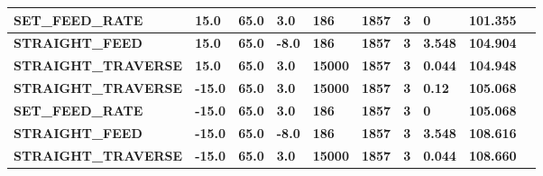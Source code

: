 \documentclass[aspectratio=169]{beamer}
\begin{document}
{\begin{frame}[fragile]
\begin{tabular}{|l|l|l|l|l|l|l|l|l|l|}
      \tiny{\bfseries{SET\_FEED\_RATE}} & 
      \tiny{\bfseries{15.0}} & 
      \tiny{\bfseries{65.0}} & 
      \tiny{\bfseries{3.0}} & 
      \tiny{\bfseries{186}} & 
      \tiny{\bfseries{1857}} & 
      \tiny{\bfseries{3}} & 
      \tiny{\bfseries{0}} & 
      \tiny{\bfseries{101.355}} \\
      \hline

      \tiny{\bfseries{STRAIGHT\_FEED}} & 
      \tiny{\bfseries{15.0}} & 
      \tiny{\bfseries{65.0}} & 
      \tiny{\bfseries{-8.0}} & 
      \tiny{\bfseries{186}} & 
      \tiny{\bfseries{1857}} & 
      \tiny{\bfseries{3}} & 
      \tiny{\bfseries{3.548}} & 
      \tiny{\bfseries{104.904}} \\
      \hline

      \tiny{\bfseries{STRAIGHT\_TRAVERSE}} & 
      \tiny{\bfseries{15.0}} & 
      \tiny{\bfseries{65.0}} & 
      \tiny{\bfseries{3.0}} & 
      \tiny{\bfseries{15000}} & 
      \tiny{\bfseries{1857}} & 
      \tiny{\bfseries{3}} & 
      \tiny{\bfseries{0.044}} & 
      \tiny{\bfseries{104.948}} \\
      \hline

      \tiny{\bfseries{STRAIGHT\_TRAVERSE}} & 
      \tiny{\bfseries{-15.0}} & 
      \tiny{\bfseries{65.0}} & 
      \tiny{\bfseries{3.0}} & 
      \tiny{\bfseries{15000}} & 
      \tiny{\bfseries{1857}} & 
      \tiny{\bfseries{3}} & 
      \tiny{\bfseries{0.12}} & 
      \tiny{\bfseries{105.068}} \\
      \hline

      \tiny{\bfseries{SET\_FEED\_RATE}} & 
      \tiny{\bfseries{-15.0}} & 
      \tiny{\bfseries{65.0}} & 
      \tiny{\bfseries{3.0}} & 
      \tiny{\bfseries{186}} & 
      \tiny{\bfseries{1857}} & 
      \tiny{\bfseries{3}} & 
      \tiny{\bfseries{0}} & 
      \tiny{\bfseries{105.068}} \\
      \hline

      \tiny{\bfseries{STRAIGHT\_FEED}} & 
      \tiny{\bfseries{-15.0}} & 
      \tiny{\bfseries{65.0}} & 
      \tiny{\bfseries{-8.0}} & 
      \tiny{\bfseries{186}} & 
      \tiny{\bfseries{1857}} & 
      \tiny{\bfseries{3}} & 
      \tiny{\bfseries{3.548}} & 
      \tiny{\bfseries{108.616}} \\
      \hline

      \tiny{\bfseries{STRAIGHT\_TRAVERSE}} & 
      \tiny{\bfseries{-15.0}} & 
      \tiny{\bfseries{65.0}} & 
      \tiny{\bfseries{3.0}} & 
      \tiny{\bfseries{15000}} & 
      \tiny{\bfseries{1857}} & 
      \tiny{\bfseries{3}} & 
      \tiny{\bfseries{0.044}} & 
      \tiny{\bfseries{108.660}} \\
      \hline


\end{tabular}
\end{frame}}
\end{document}
